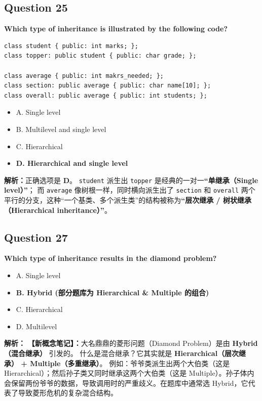 \documentclass[11pt, a4paper]{article}
\begin{document}

\subsection*{Question 25}
\textbf{Which type of inheritance is illustrated by the following code?}
\begin{lstlisting}
class student { public: int marks; };
class topper: public student { public: char grade; };

class average { public: int makrs_needed; };
class section: public average { public: char name[10]; };
class overall: public average { public: int students; };
\end{lstlisting}
\begin{itemize}
    \item A. Single level
    \item B. Multilevel and single level
    \item C. Hierarchical
    \item \textbf{D. Hierarchical and single level}
\end{itemize}

\textbf{解析：}正确选项是 \textbf{D}。
\texttt{student} 派生出 \texttt{topper} 是经典的一对一\textbf{“单继承（Single level）”}；
而 \texttt{average} 像树根一样，同时横向派生出了 \texttt{section} 和 \texttt{overall} 两个平行的分支，这种“一个基类、多个派生类”的结构被称为\textbf{“层次继承 / 树状继承（Hierarchical inheritance）”}。


\subsection*{Question 27}
\textbf{Which type of inheritance results in the diamond problem?}
\begin{itemize}
    \item A. Single level
    \item \textbf{B. Hybrid (部分题库为 Hierarchical \& Multiple 的组合)}
    \item C. Hierarchical
    \item D. Multilevel
\end{itemize}

\textbf{解析：}
\textbf{【新概念笔记】：}大名鼎鼎的菱形问题（Diamond Problem）是由 \textbf{Hybrid（混合继承）} 引发的。
什么是混合继承？它其实就是 \textbf{Hierarchical（层次继承） + Multiple（多重继承）}。
例如：爷爷类派生出两个大伯类（这是 Hierarchical）；然后孙子类又同时继承这两个大伯类（这是 Multiple）。孙子体内会保留两份爷爷的数据，导致调用时的严重歧义。在题库中通常选 Hybrid，它代表了导致菱形危机的复杂混合结构。
\end{document}
